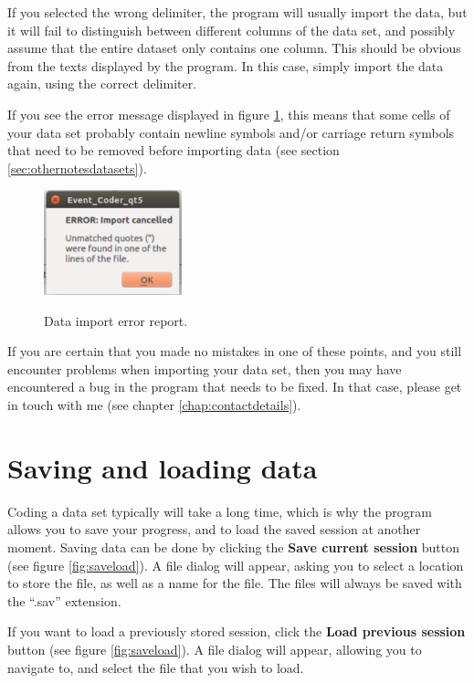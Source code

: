 \documentclass{memoir}
\begin{document}
If you selected the wrong delimiter, the program will usually import the data, but it will fail to distinguish between different columns of the data set, and possibly assume that the entire dataset only contains one column. This should be obvious from the texts displayed by the program. In this case, simply import the data again, using the correct delimiter. 

If you see the error message displayed in figure \ref{fig:importerror}, this means that some cells of your data set probably contain newline symbols and/or carriage return symbols that need to be removed before importing data (see section \ref{sec:othernotesdatasets}).

\begin{figure}[h!]
  \centering
  \caption{Data import error report.}
  \includegraphics[width=40mm]{Screenshot_1.pdf}
  \label{fig:importerror}
\end{figure}

If you are certain that you made no mistakes in one of these points, and you still encounter problems when importing your data set, then you may have encountered a bug in the program that needs to be fixed. In that case, please get in touch with me (see chapter \ref{chap:contactdetails}).

\section{Saving and loading data}
\label{sec:savingloadingdata}

Coding a data set typically will take a long time, which is why the program allows you to save your progress, and to load the saved session at another moment. Saving data can be done by clicking the \textbf{Save current session} button (see figure \ref{fig:saveload}). A file dialog will appear, asking you to select a location to store the file, as well as a name for the file. The files will always be saved with the ``.sav'' extension.

If you want to load a previously stored session, click the \textbf{Load previous session} button (see figure \ref{fig:saveload}). A file dialog will appear, allowing you to navigate to, and select the file that you wish to load. 
\end{document}
